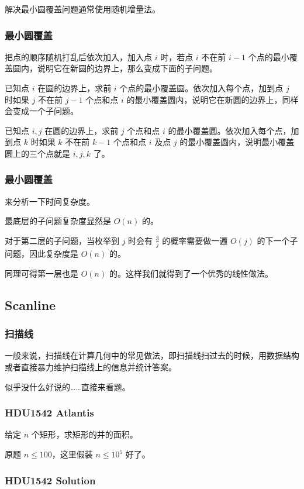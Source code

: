 \documentclass[10pt]{beamer}
\begin{document}
\begin{CJK}{UTF8}{gkai}
\begin{spacing}{1.2}
\begin{frame}
			解决最小圆覆盖问题通常使用随机增量法。

		\end{frame}
		\begin{frame}
			\frametitle{最小圆覆盖}

			把点的顺序随机打乱后依次加入，加入点 $i$ 时，若点 $i$ 不在前 $i-1$ 个点的最小覆盖圆内，说明它在新圆的边界上，那么变成下面的子问题。
			
			已知点 $i$ 在圆的边界上，求前 $i$ 个点的最小覆盖圆。依次加入每个点，加到点 $j$ 时如果 $j$ 不在前 $j - 1$ 个点和点 $i$ 的最小覆盖圆内，说明它在新圆的边界上，同样会变成一个子问题。

			已知点 $i,j$ 在圆的边界上，求前 $j$ 个点和点 $i$ 的最小覆盖圆。依次加入每个点，加到点 $k$ 时如果 $k$ 不在前 $k-1$ 个点和点 $i$ 及点 $j$ 的最小覆盖圆内，说明最小覆盖圆上的三个点就是 $i,j,k$ 了。

		\end{frame}
		\begin{frame}
			\frametitle{最小圆覆盖}

			来分析一下时间复杂度。\pause

			最底层的子问题复杂度显然是 $O(n)$ 的。\pause

			对于第二层的子问题，当枚举到 $j$ 时会有 $\frac{3}{j}$ 的概率需要做一遍 $O(j)$ 的下一个子问题，因此复杂度是 $O(n)$ 的。\pause

			同理可得第一层也是 $O(n)$ 的。这样我们就得到了一个优秀的线性做法。

		\end{frame}
		\subsection{Scanline}
		\begin{frame}
			\frametitle{扫描线}

			一般来说，扫描线在计算几何中的常见做法，即扫描线扫过去的时候，用数据结构或者直接暴力维护扫描线上的信息并统计答案。\pause

			似乎没什么好说的……直接来看题。

		\end{frame}
		\begin{frame}
			\frametitle{HDU1542 Atlantis}

			给定 $n$ 个矩形，求矩形的并的面积。 \pause

			原题 $n \le 100$，这里假装 $n \le 10^5$ 好了。

		\end{frame}
		\begin{frame}
			\frametitle{HDU1542 Solution}


\end{frame}
\end{spacing}
\end{CJK}
\end{document}
